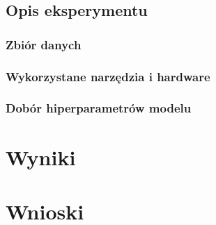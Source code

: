 \documentclass[oneside, mag]{mgr}
\begin{document}
\section{Opis eksperymentu}

\subsection{Zbiór danych}

\subsection{Wykorzystane narzędzia i hardware}

\subsection{Dobór hiperparametrów modelu}



\chapter{Wyniki}


\chapter{Wnioski}



\listoffigures
\end{document}
